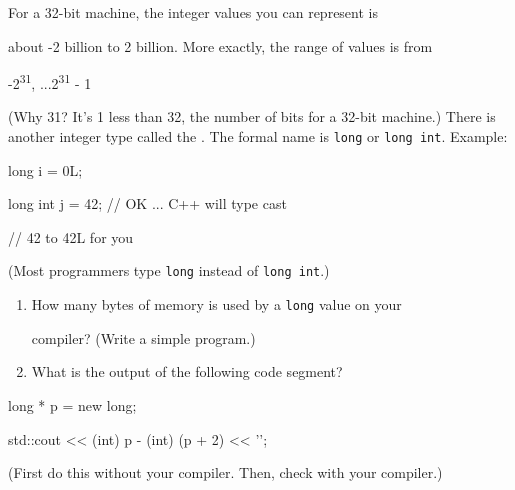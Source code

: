 For a 32-bit machine, the integer values you can represent is

about -2 billion to 2 billion. More exactly, the range of values is from

\begin{center}

-2\textsuperscript{31}, ...2\textsuperscript{31} - 1

\end{center}

(Why 31? It's 1 less than 32, the number of bits for a 32-bit machine.) There is another integer type called the . The formal name is \texttt{long} or \texttt{long int}. Example:



\begin{consolethree}[escapeinside=||]

long i = 0L;

long int j = 42; // OK ... C++ will type cast

                 // 42 to 42L for you

\end{consolethree}



(Most programmers type \texttt{long} instead of \texttt{long int}.)



\begin{enumerate}

\def\labelenumi{(\alph{enumi})}

\item How many bytes of memory is used by a \texttt{long} value on your

  compiler? (Write a simple program.)

\item What is the output of the following code segment?

\end{enumerate}



\begin{consolethree}[escapeinside=||]

long * p = new long;

std::cout << (int) p - (int) (p + 2) << '\n';

\end{consolethree}



(First do this without your compiler. Then, check with your compiler.)

